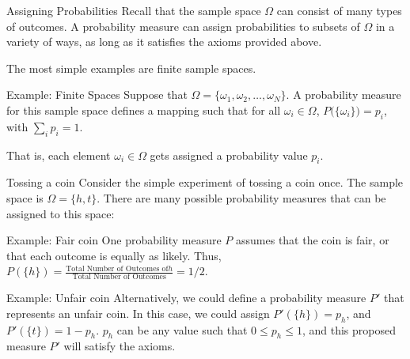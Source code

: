 \begin{frame}{Assigning Probabilities}
  Recall that the sample space $\Omega$ can consist of many types of outcomes. A probability measure can assign probabilities to subsets of $\Omega$ in a variety of ways, as long as it satisfies the axioms provided above.
  
  The most simple examples are finite sample spaces.
  \begin{exampleblock}{Example: Finite Spaces}
  Suppose that $\Omega = \{\omega_1, \omega_2, \ldots, \omega_N\}$.
  A probability measure for this sample space defines a mapping such that for all $\omega_i \in \Omega$, $P\big(\{\omega_i\}\big) = p_i$, with $\sum_i p_i = 1$.
  
  That is, each element $\omega_i \in \Omega$ gets assigned a probability value $p_i$.
  \end{exampleblock}
  
\end{frame}

\begin{frame}{Tossing a coin}
  Consider the simple experiment of tossing a coin once. The sample space is $\Omega = \{h, t\}$. There are many possible probability measures that can be assigned to this space:
  \begin{exampleblock}{Example: Fair coin}
    One probability measure $P$ assumes that the coin is fair, or that each outcome is equally as likely.
    Thus, $P(\{h\}) = \frac{\text{Total Number of Outcomes of} h}{\text{Total Number of Outcomes}} = 1/2$.
  \end{exampleblock}
  
  \begin{exampleblock}{Example: Unfair coin}
    Alternatively, we could define a probability measure $P'$ that represents an unfair coin. In this case, we could assign $P'(\{h\}) = p_h$, and $P'(\{t\}) = 1 - p_h$. $p_h$ can be any value such that $0 \leq p_h \leq 1$, and this proposed measure $P'$ will satisfy the axioms.
  \end{exampleblock}
\end{frame}


